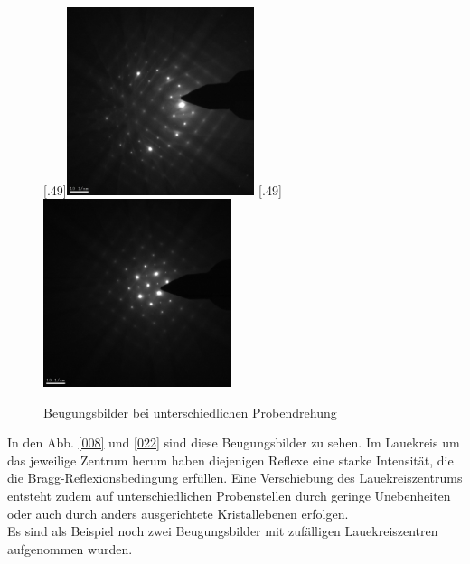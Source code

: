 \documentclass[a4paper,11pt,DIV=11]{scrartcl}
\begin{document}
\begin{figure}[htb]\centering
	[.49\linewidth]{\includegraphics[width=0.49\textwidth]{Versuchsdaten/9/008.jpg}}
	[.49\linewidth]{\includegraphics[width=0.49\textwidth]{Versuchsdaten/9/022.jpg}}\\
	\caption{Beugungsbilder bei unterschiedlichen Probendrehung} \label{laue1}
\end{figure}

In den Abb. \ref{008} und \ref{022} sind diese Beugungsbilder zu sehen. Im Lauekreis um das jeweilige Zentrum herum haben diejenigen Reflexe eine starke Intensität, die die Bragg-Reflexionsbedingung erfüllen. Eine Verschiebung des Lauekreiszentrums entsteht zudem auf unterschiedlichen Probenstellen durch geringe Unebenheiten oder auch durch anders ausgerichtete Kristallebenen erfolgen. \\
Es sind als Beispiel noch zwei Beugungsbilder mit zufälligen Lauekreiszentren aufgenommen wurden.
\end{document}
